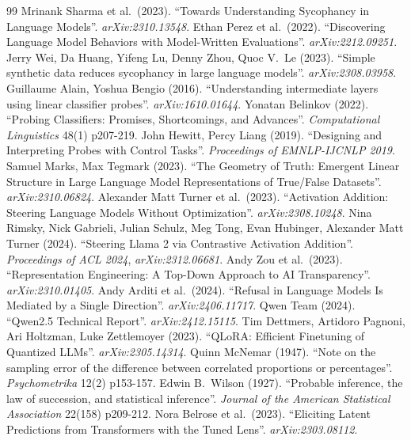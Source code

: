 \documentclass[12pt]{report}
\theoremstyle{definition}
\begin{document}
\begin{thebibliography}{99}
 Mrinank Sharma et al.\ (2023). ``Towards Understanding Sycophancy in Language Models''. \textit{arXiv:2310.13548}.
 Ethan Perez et al.\ (2022). ``Discovering Language Model Behaviors with Model-Written Evaluations''. \textit{arXiv:2212.09251}.
 Jerry Wei, Da Huang, Yifeng Lu, Denny Zhou, Quoc V.\ Le (2023). ``Simple synthetic data reduces sycophancy in large language models''. \textit{arXiv:2308.03958}.
 Guillaume Alain, Yoshua Bengio (2016). ``Understanding intermediate layers using linear classifier probes''. \textit{arXiv:1610.01644}.
 Yonatan Belinkov (2022). ``Probing Classifiers: Promises, Shortcomings, and Advances''. \textit{Computational Linguistics} 48(1) p207-219.
 John Hewitt, Percy Liang (2019). ``Designing and Interpreting Probes with Control Tasks''. \textit{Proceedings of EMNLP-IJCNLP 2019}.
 Samuel Marks, Max Tegmark (2023). ``The Geometry of Truth: Emergent Linear Structure in Large Language Model Representations of True/False Datasets''. \textit{arXiv:2310.06824}.
 Alexander Matt Turner et al.\ (2023). ``Activation Addition: Steering Language Models Without Optimization''. \textit{arXiv:2308.10248}.
 Nina Rimsky, Nick Gabrieli, Julian Schulz, Meg Tong, Evan Hubinger, Alexander Matt Turner (2024). ``Steering Llama 2 via Contrastive Activation Addition''. \textit{Proceedings of ACL 2024}, \textit{arXiv:2312.06681}.
 Andy Zou et al.\ (2023). ``Representation Engineering: A Top-Down Approach to AI Transparency''. \textit{arXiv:2310.01405}.
 Andy Arditi et al.\ (2024). ``Refusal in Language Models Is Mediated by a Single Direction''. \textit{arXiv:2406.11717}.
 Qwen Team (2024). ``Qwen2.5 Technical Report''. \textit{arXiv:2412.15115}.
 Tim Dettmers, Artidoro Pagnoni, Ari Holtzman, Luke Zettlemoyer (2023). ``QLoRA: Efficient Finetuning of Quantized LLMs''. \textit{arXiv:2305.14314}.
 Quinn McNemar (1947). ``Note on the sampling error of the difference between correlated proportions or percentages''. \textit{Psychometrika} 12(2) p153-157.
 Edwin B.\ Wilson (1927). ``Probable inference, the law of succession, and statistical inference''. \textit{Journal of the American Statistical Association} 22(158) p209-212.
 Nora Belrose et al.\ (2023). ``Eliciting Latent Predictions from Transformers with the Tuned Lens''. \textit{arXiv:2303.08112}.
\end{thebibliography}
\end{document}
